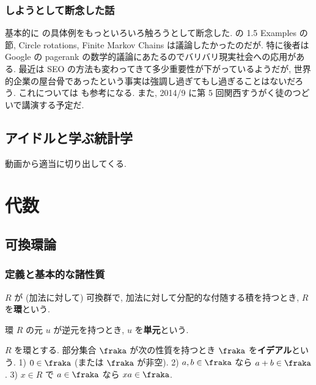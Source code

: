 \documentclass[openany, a4paper, oneside]{jsbook}
\begin{document}
\section{しようとして断念した話}

基本的に \cite{OmriSarig1} の具体例をもっといろいろ触ろうとして断念した.
\cite{OmriSarig1} の 1.5 Examples の節, Circle rotations, Finite Markov Chains は議論したかったのだが.
特に後者は Google の pagerank の数学的議論にあたるのでバリバリ現実社会への応用がある.
最近は SEO の方法も変わってきて多少重要性が下がっているようだが,
世界的企業の屋台骨であったという事実は強調し過ぎてもし過ぎることはないだろう.
これについては \cite{TadahisaFunaki1, phasetr3} も参考になる.
また, 2014/9 に第 5 回関西すうがく徒のつどいで講演する予定だ.
\chapter{アイドルと学ぶ統計学}

動画から適当に切り出してくる.
\part{代数}

\chapter{可換環論}

\section{定義と基本的な諸性質}

\begin{defn}
 $R$ が (加法に対して) 可換群で, 加法に対して分配的な付随する積を持つとき, $R$ を\textbf{環}という.
\end{defn}
\begin{defn}
 環 $R$ の元 $u$ が逆元を持つとき, $u$ を\textbf{単元}という.
\end{defn}
\begin{defn}
 $R$ を環とする.
 部分集合 $\fraka$ が次の性質を持つとき $\fraka$ を\textbf{イデアル}という.
 1) $0 \in \fraka$ (または $\fraka$ が非空).
 2) $a, b \in \fraka$ なら $a + b \in \fraka$.
 3) $x \in R$ で $a \in \fraka$ なら $xa \in \fraka$.
\end{defn}
\end{document}
